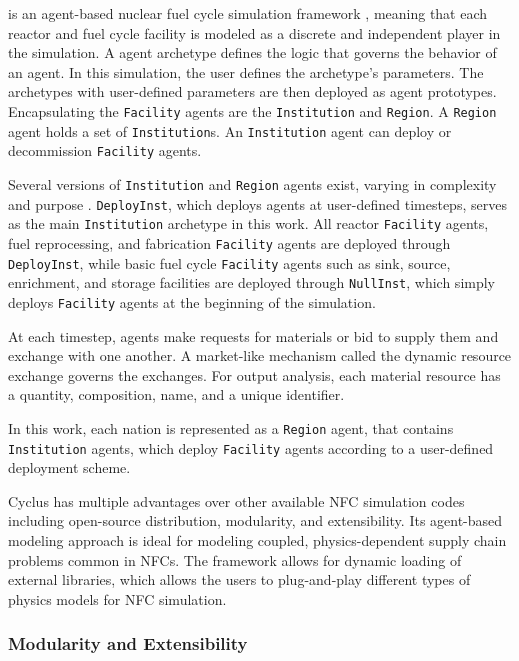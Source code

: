 \Cyclus is an agent-based nuclear fuel cycle simulation framework 
\cite{huff_fundamental_2016}, meaning
that each reactor and fuel cycle facility is modeled as a discrete and independent
player in the simulation.
A \Cyclus agent archetype defines the logic that governs the behavior
of an agent. In this simulation, the user defines the archetype's
parameters. The archetypes with user-defined parameters are then deployed
as agent prototypes.  Encapsulating the \texttt{Facility} agents are the \texttt{Institution} and \texttt{Region}.
A \texttt{Region} agent holds a set of \texttt{Institution}s. 
An \texttt{Institution} agent can deploy or decommission \texttt{Facility} agents.

Several versions of \texttt{Institution}
and \texttt{Region} agents exist, varying in complexity and purpose \cite{huff_extensions_2014}.
\texttt{DeployInst}, which deploys agents at user-defined timesteps, serves
as the main \texttt{Institution} archetype in this work. All reactor \texttt{Facility} agents,
fuel reprocessing, and fabrication \texttt{Facility} agents
are deployed through \texttt{DeployInst}, while basic fuel cycle \texttt{Facility} agents
such as sink, source, enrichment, and storage facilities are deployed 
through \texttt{NullInst}, which simply deploys \texttt{Facility}
agents at the beginning of the simulation.

At each timestep,
agents make requests for materials or bid to supply them and exchange
with one another. A market-like mechanism called the dynamic resource exchange
\cite{gidden_methodology_2016} governs the exchanges.
For output analysis, each material resource has a quantity, composition, name, and a unique identifier.

In this work, each nation is represented as a \texttt{Region} agent,
that contains \texttt{Institution} agents, which deploy \texttt{Facility} 
agents according to a user-defined deployment scheme.

Cyclus has multiple advantages over other available
\gls{NFC} simulation codes including open-source distribution, modularity,
and extensibility. Its agent-based modeling approach
is ideal for modeling coupled, physics-dependent
supply chain problems common in \glspl{NFC}.
The framework allows for dynamic loading of 
external libraries, which allows the users to plug-and-play
different types of physics models for \gls{NFC}
simulation.


\subsubsection{Modularity and Extensibility}

